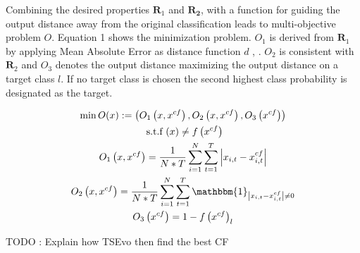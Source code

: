 Combining the desired properties $\mathbf{R}_{1}$ and $\mathbf{R}_{\mathbf{2}}$, with a function for guiding the output distance away from the original classification leads to multi-objective problem $O$. Equation 1 shows the minimization problem. $O_{1}$ is derived from $\mathbf{R}_{1}$ by applying Mean Absolute Error as distance function $d$ \cite{mothilal_explaining_2020}, \cite{wachter_counterfactual_2018}. $O_{2}$ is consistent with $\mathbf{R}_{2}$ and $O_{3}$ denotes the output distance maximizing the output distance on a target class $l$. If no target class is chosen the second highest class probability is designated as the target.

\begin{multline}
\min O(x):=\left(O_{1}\left(x, x^{c f}\right), O_{2}\left(x, x^{c f}\right), O_{3}\left(x^{c f}\right)\right) \\
\text { s.t.f }(x) \neq f\left(x^{c f}\right) \\
O_{1}\left(x, x^{c f}\right)=\frac{1}{N * T} \sum_{i=1}^{N} \sum_{t=1}^{T}\left|x_{i, t}-x_{i, t}^{c f}\right| \\
O_{2}\left(x, x^{c f}\right)=\frac{1}{N * T} \sum_{i=1}^{N} \sum_{t=1}^{T} \mathbbm{1}_{\left|x_{i, t}-x_{i, t}^{c f}\right| \neq 0} \\
O_{3}\left(x^{c f}\right)=1-f\left(x^{c f}\right)_{l}    \\
\end{multline}

TODO : Explain how TSEvo then find the best CF

